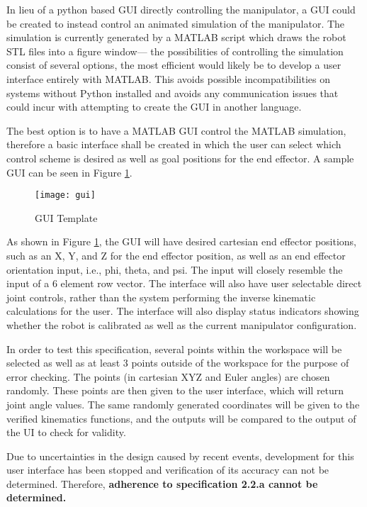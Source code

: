 In lieu of a python based GUI directly controlling the manipulator, a GUI could be created to instead control an animated simulation of the manipulator. The simulation is currently generated by a MATLAB script which draws the robot STL files into a figure window— the possibilities of controlling the simulation consist of several options, the most efficient would likely be to develop a user interface entirely with MATLAB. This avoids possible incompatibilities on systems without Python installed and avoids any communication issues that could incur with attempting to create the GUI in another language.

The best option is to have a MATLAB GUI control the MATLAB simulation, therefore a basic interface shall be created in which the user can select which control scheme is desired as well as goal positions for the end effector. A sample GUI can be seen in Figure \ref{fig:gui}.
\let\clearpage\relax
\begin{figure}[htp]
  \centering
  \texttt{[image: gui]}
  \caption{GUI Template}
  \label{fig:gui}
\end{figure}

As shown in Figure \ref{fig:gui}, the GUI will have desired cartesian end effector positions, such as an X, Y, and Z for the end effector position, as well as an end effector orientation input, i.e., phi, theta, and psi. The input will closely resemble the input of a 6 element row vector. The interface will also have user selectable direct joint controls, rather than the system performing the inverse kinematic calculations for the user. The interface will also display status indicators showing whether the robot is calibrated as well as the current manipulator configuration.

In order to test this specification, several points within the workspace will be selected as well as at least 3 points outside of the workspace for the purpose of error checking. The points (in cartesian XYZ and Euler angles) are chosen randomly. These points are then given to the user interface, which will return joint angle values. The same randomly generated coordinates will be given to the verified kinematics functions, and the outputs will be compared to the output of the UI to check for validity.

Due to uncertainties in the design caused by recent events, development for this user interface has been stopped and verification of its accuracy can not be determined. Therefore, \textbf{adherence to specification 2.2.a cannot be determined.}


